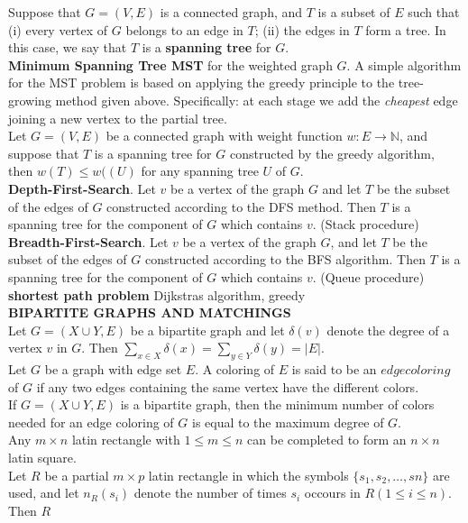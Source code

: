 \documentclass[10pt,landscape]{article}
\begin{document}
\begin{multicols}{4}
Suppose that $G = (V, E)$ is a connected graph, and $T$ is a subset of
$E$ such that (i) every vertex of $G$ belongs to an edge in $T$; (ii)
the edges in $T$ form a tree. In this case, we say that $T$ is a
\textbf{spanning tree} for $G$.\\
\textbf{Minimum Spanning Tree MST} for the weighted graph $G$. A
simple algorithm for the MST problem is based on applying the greedy
principle to the tree-growing method given above. Specifically: at
each stage we add the \textit{cheapest} edge joining a new vertex to
the partial tree.\\
Let $G = (V,E)$ be a connected graph with weight function $w: E \to
\mathbb{N}$, and suppose that $T$ is a spanning tree for $G$
constructed by the greedy algorithm, then $w(T) \leq w((U)$ for any
spanning tree $U$ of $G$.\\
\textbf{Depth-First-Search}. Let $v$ be a vertex of the graph $G$ and
let $T$ be the subset of the edges of $G$ constructed according to the
DFS method. Then $T$ is a spanning tree for the component of $G$ which
contains $v$. (Stack procedure)\\
\textbf{Breadth-First-Search}. Let $v$ be a vertex of the graph $G$,
and let $T$ be  the subset of the edges of $G$ constructed according
to the BFS algorithm. Then $T$ is a spanning tree for the component of
$G$ which contains $v$. (Queue procedure)\\
\textbf{shortest path problem} Dijkstras algorithm, greedy\\
\textbf{BIPARTITE GRAPHS AND MATCHINGS}\\
Let $G = (X \cup Y, E)$ be a bipartite graph and let $\delta(v)$
denote the degree of a vertex $v$ in $G$. Then $\displaystyle\sum_{x
  \in X} \delta(x) = \displaystyle\sum_{y \in Y} \delta(y) = |E|$.\\
Let $G$ be a graph with edge set $E$. A coloring of $E$ is said to be
an $edge coloring$ of $G$ if any two edges containing the same vertex
have the different colors.\\
If $G = (X \cup Y, E)$ is a bipartite graph, then the minimum number
of colors needed for an edge coloring of $G$ is equal to the maximum
degree of $G$.\\
Any $m \times n$ latin rectangle with $1 \leq m \leq n$ can be
completed to form an $n \times n$ latin square.\\
Let $R$ be a partial $m \times p$ latin rectangle in which the symbols
$\{s_{1}, s_{2}, \dots,s{n}\}$ are used, and let $n_{R}(s_{i})$ denote
the number of times $s_{i}$ occours in $R(1 \leq i \leq n)$. Then $R$

\end{multicols}
\end{document}
